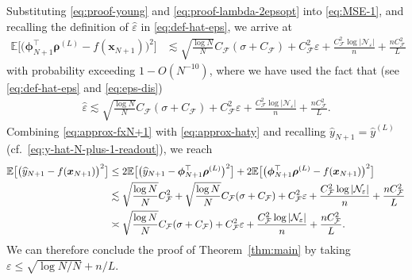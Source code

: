 \documentclass[english]{article}
\begin{document}
%
Substituting \eqref{eq:proof-young} and \eqref{eq:proof-lambda-2epsopt} into \eqref{eq:MSE-1}, and recalling the definition of $\widehat{\varepsilon}$ in \eqref{eq:def-hat-eps}, we arrive at
%
\begin{align}
\mathbb{E}\big[\big({\bm \phi}_{N+1}^{\top}{\bm \rho}^{(L)} - f({\bm x}_{N+1})\big)^2\big]
&\lesssim \sqrt{\frac{\log N}{N}}C_{\mathcal{F}}(\sigma + C_{\mathcal{F}})
+C_{\mathcal{F}}^2\varepsilon + \frac{C_{\mathcal{F}}^2\log|\mathcal{N}_{\varepsilon}|}{n} +  \frac{nC_{\mathcal{F}}^2}{L} \label{eq:approx-fxN+1}
\end{align}
with probability exceeding $1-O(N^{-10})$,
where we have used the fact that (see \eqref{eq:def-hat-eps} and \eqref{eq:eps-dis})
%
\begin{align*}
   \widehat{\varepsilon} \lesssim  \sqrt{\frac{\log N}{N}}C_{\mathcal{F}}(\sigma + C_{\mathcal{F}})
+ C_{\mathcal{F}}^2\varepsilon + \frac{C_{\mathcal{F}}^2\log|\mathcal{N}_\varepsilon|}{n} +\frac{nC_{\mathcal{F}}^2}{L}.
\end{align*}
%
Combining \eqref{eq:approx-fxN+1} with \eqref{eq:approx-haty} and recalling $\widehat{y}_{N+1} = \widehat{y}^{(L)}$ (cf.~\eqref{eq:y-hat-N-plus-1-readout}), we reach
%
\begin{align*}
\mathbb{E}\big[\big(\widehat{y}_{N+1} - f({\bm x}_{N+1})\big)^2\big]
&\le 2\mathbb{E}\big[\big(\widehat{y}_{N+1} - {\bm \phi}_{N+1}^{\top}{\bm \rho}^{(L)}\big)^2\big] + 2\mathbb{E}\big[\big({\bm \phi}_{N+1}^{\top}{\bm \rho}^{(L)} - f({\bm x}_{N+1})\big)^2\big]\notag\\
&\lesssim \sqrt{\frac{\log N}{N}}C_{\mathcal{F}}^2 + \sqrt{\frac{\log N}{N}}C_{\mathcal{F}}(\sigma + C_{\mathcal{F}})
+C_{\mathcal{F}}^2\varepsilon + \frac{C_{\mathcal{F}}^2\log|\mathcal{N}_{\varepsilon}|}{n} +  \frac{nC_{\mathcal{F}}^2}{L} \notag\\
&\asymp \sqrt{\frac{\log N}{N}}C_{\mathcal{F}}(\sigma + C_{\mathcal{F}})
+C_{\mathcal{F}}^2\varepsilon + \frac{C_{\mathcal{F}}^2\log|\mathcal{N}_{\varepsilon}|}{n} +  \frac{nC_{\mathcal{F}}^2}{L}.
\end{align*}
%
We can therefore conclude the proof of  Theorem~\ref{thm:main} by taking $\varepsilon \le \sqrt{\log N/N} + n/L$.
\end{document}
